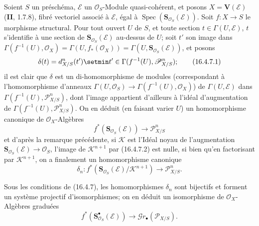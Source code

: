 \begin{env}[16.4.7]
\label{IV.16.4.7}
Soient $S$ un préschéma, $\mathscr{E}$ un $\mathcal{O}_S$-Module
quasi-cohérent, et posons $X=\mathbf{V}(\mathscr{E})$ (\textbf{II}, 1.7.8), fibré
vectoriel associé à $\mathscr{E}$, égal à
$\operatorname{Spec}(\mathbf{S}_{\mathcal{O}_S}(\mathscr{E}))$. Soit
$f:X\to S$ le morphisme structural. Pour tout ouvert $U$ de $S$, et toute
section $t\in\Gamma(U,\mathscr{E})$, $t$ s'identifie à une section de
$\mathbf{S}_{\mathcal{O}_S}(\mathscr{E})$ au-dessus de $U$; soit $t'$ son
image dans
$\Gamma(f^{-1}(U),\mathcal{O}_X)=\Gamma(U,f_*(\mathcal{O}_X))=
\Gamma(U,\mathbf{S}_{\mathcal{O}_S}(\mathscr{E}))$, et posons
\[
  \delta(t)=d_{X/S}^n(t')\setmin t'\in
  \Gamma(f^{-1}(U),\mathscr{P}_{X/S}^n);
  \tag{16.4.7.1}
  \label{IV.16.4.7.1}
\]
il est clair que $\delta$ est un di-homomorphisme de modules (correspondant à
l'homomorphisme d'anneaux
$\Gamma(U,\mathcal{O}_S)\to\Gamma(f^{-1}(U),\mathcal{O}_X)$) de
$\Gamma(U,\mathscr{E})$ dans $\Gamma(f^{-1}(U),\mathscr{P}_{X/S}^n)$, dont
l'image appartient d'ailleurs à l'idéal d'augmentation de
$\Gamma(f^{-1}(U),\mathscr{P}_{X/S}^n)$. On en déduit (en faisant varier $U$)
un homomorphisme canonique de $\mathcal{O}_X$-Algèbres
\[
  f^*(\mathbf{S}_{\mathcal{O}_S}(\mathscr{E}))
  \longrightarrow\mathscr{P}_{X/S}^n
  \tag{16.4.7.2}
  \label{IV.16.4.7.2}
\]
et d'après la remarque précédente, si $\mathscr{K}$ est l'Idéal noyau de
l'augmentation $\mathbf{S}_{\mathcal{O}_S}(\mathscr{E})\to\mathcal{O}_S$,
l'image de $\mathscr{K}^{n+1}$ par (16.4.7.2) est nulle, si bien qu'en
factorisant par $\mathscr{K}^{n+1}$, on a finalement un homomorphisme canonique
\[
  \delta_n:f^*(\mathbf{S}_{\mathcal{O}_S}(\mathscr{E})/
  \mathscr{K}^{n+1})\longrightarrow\mathscr{P}_{X/S}^n.
  \tag{16.4.7.3}
  \label{IV.16.4.7.3}
\]
\end{env}

\begin{proposition}[16.4.8]
\label{IV.16.4.8}
Sous les conditions de \textup{(16.4.7)}, les homomorphismes $\delta_n$ sont bijectifs et
forment un système projectif d'isomorphismes; on en déduit un isomorphisme de
$\mathcal{O}_X$-Algèbres graduées
\[
  f^*(\mathbf{S}_{\mathcal{O}_S}^{\bullet}(\mathscr{E}))
  \longrightarrow\mathscr{G}r_\bullet(\mathscr{P}_{X/S}).
  \tag{16.4.8.1}
  \label{IV.16.4.8.1}
\]
\end{proposition}

